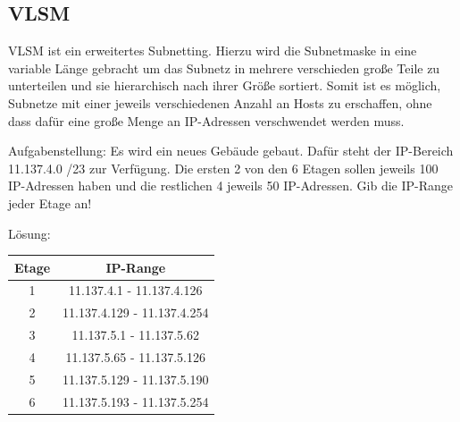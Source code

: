 \documentclass[12pt,a4paper]{article}
\begin{document}
\subsection{VLSM}
    VLSM ist ein erweitertes Subnetting. Hierzu wird die Subnetmaske in eine variable Länge gebracht um das Subnetz in mehrere verschieden große Teile zu unterteilen und sie hierarchisch nach ihrer Größe sortiert. Somit ist es möglich, Subnetze mit einer jeweils verschiedenen Anzahl an Hosts zu erschaffen, ohne dass dafür eine große Menge an IP-Adressen verschwendet werden muss.\vspace{.3cm}\newline
\begin{minipage}[t]{.45\textwidth}
	Aufgabenstellung:
    \vspace{.2cm}\newline
    Es wird ein neues Gebäude gebaut. Dafür steht der IP-Bereich 11.137.4.0 /23 zur Verfügung. Die ersten 2 von den 6 Etagen sollen jeweils 100 IP-Adressen haben und die restlichen 4 jeweils 50 IP-Adressen. Gib die IP-Range jeder Etage an!
\end{minipage}
\hspace{1cm}
\begin{minipage}[t]{.45\textwidth}
    Lösung:\vspace{.2cm}\newline
    	\renewcommand{\arraystretch}{1.5}
    	\begin{tabularx}{7.3cm}{|c|c|}
    		\hline
    		\cellcolor{cyan!60!white}Etage&\cellcolor{cyan!60!white}IP-Range \\
    		\hline
    		1&11.137.4.1   -  11.137.4.126 \\
    		\hline
    		2&11.137.4.129 -  11.137.4.254 \\
    		\hline
    		3&11.137.5.1   -  11.137.5.62 \\
    		\hline
    		4&11.137.5.65  -  11.137.5.126 \\
    		\hline
    		5&11.137.5.129 -  11.137.5.190 \\
    		\hline
    		6&11.137.5.193 -  11.137.5.254 \\
    		\hline
    	\end{tabularx}
\end{minipage}
\end{document}
